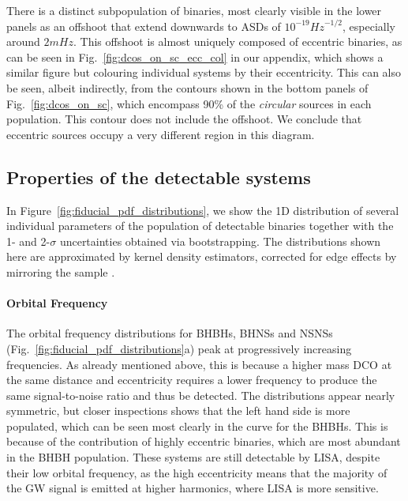 There is a distinct subpopulation of binaries, most clearly visible in the lower panels as an offshoot that extend downwards to ASDs of $10^{-19} \unit{Hz}^{-1/2}$, especially around $2 \unit{mHz}$. This offshoot is almost uniquely composed of eccentric binaries, as can be seen in Fig.~\ref{fig:dcos_on_sc_ecc_col} in our appendix, which shows a similar figure but colouring individual systems by their eccentricity. This can also be seen, albeit indirectly, from the contours shown in the bottom panels of Fig.~\ref{fig:dcos_on_sc}, which encompass 90\% of the \textit{circular} sources in each population. This contour does not include the offshoot. We conclude that eccentric sources occupy a very different region in this diagram.

\subsection{Properties of the detectable systems}\label{sec:fiducial_distributions}
In Figure~\ref{fig:fiducial_pdf_distributions}, we show the 1D distribution of several individual parameters of the population of detectable binaries together with the 1- and 2-$\sigma$ uncertainties obtained via bootstrapping. The distributions shown here are approximated by kernel density estimators, corrected for edge effects by mirroring the sample \citep{Schuster+1985}.

\paragraph{Orbital Frequency} The orbital frequency distributions for BHBHs, BHNSs and NSNSs (Fig.~\ref{fig:fiducial_pdf_distributions}a) peak at progressively increasing frequencies. As already mentioned above, this is because a higher mass DCO at the same distance and eccentricity requires a lower frequency to produce the same signal-to-noise ratio and thus be detected. The distributions appear nearly symmetric, but closer inspections shows that the left hand side is more populated, which can be seen most clearly in the curve for the BHBHs. This is because of the contribution of highly eccentric binaries, which are most abundant in the BHBH population. These systems are still detectable by LISA, despite their low orbital frequency, as the high eccentricity means that the majority of the GW signal is emitted at higher harmonics, where LISA is more sensitive.

